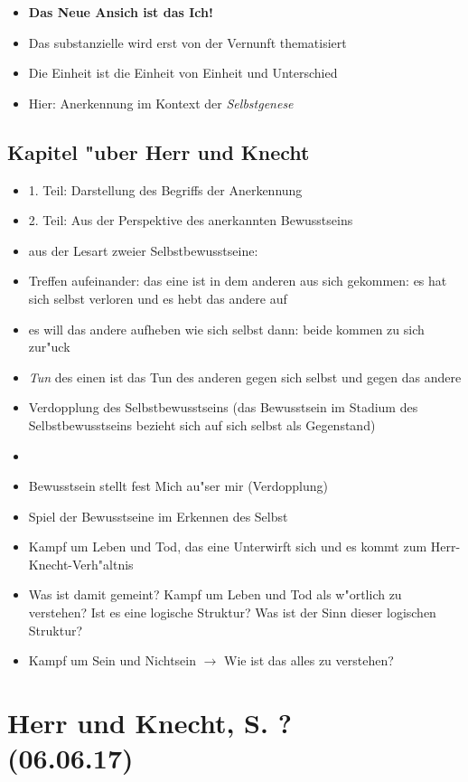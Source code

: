 \documentclass[emulatestandardclasses]{scrartcl}
\begin{document}
\begin{itemize}
  \item \textbf{Das Neue Ansich ist das Ich!}
  \item Das substanzielle wird erst von der Vernunft thematisiert
  \item Die Einheit ist die Einheit von Einheit und Unterschied
  \item Hier: Anerkennung im Kontext der \emph{Selbstgenese}
\end{itemize}

\subsection{Kapitel "uber Herr und Knecht}

\begin{itemize}
  \item 1. Teil: Darstellung des Begriffs der Anerkennung
  \item 2. Teil: Aus der Perspektive des anerkannten Bewusstseins
  \item aus der Lesart zweier Selbstbewusstseine: 
  \item Treffen aufeinander: das eine ist in dem anderen aus sich gekommen: es hat sich selbst verloren und es hebt das andere auf 
  \item es will das andere aufheben wie sich selbst dann: beide kommen zu sich zur"uck
  \item \emph{Tun} des einen ist das Tun des anderen gegen sich selbst und gegen das andere
  \item Verdopplung des Selbstbewusstseins (das Bewusstsein im Stadium des Selbstbewusstseins bezieht sich auf sich selbst als Gegenstand)
  \item 
  \item Bewusstsein stellt fest Mich au"ser mir (Verdopplung)
  \item Spiel der Bewusstseine im Erkennen des Selbst
  \item Kampf um Leben und Tod, das eine Unterwirft sich und es kommt zum Herr-Knecht-Verh"altnis
  \item Was ist damit gemeint? Kampf um Leben und Tod als w"ortlich zu verstehen? Ist es eine logische Struktur? Was ist der Sinn dieser logischen Struktur? 
  \item Kampf um Sein und Nichtsein $\rightarrow$ Wie ist das alles zu verstehen?
\end{itemize}

\section{Herr und Knecht, S. ?\\(06.06.17)}
\end{document}
